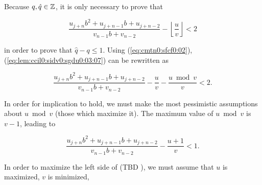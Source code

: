 \begin{vworklemmaproof}
Because $q, \hat{q} \in {\mathbb{Z}}$, it is only necessary to prove that

\begin{equation}
\label{eq:lem:ccil0:sidv0:sgdu0:03:07}
\frac{u_{j+n} b^2 + u_{j+n-1}b + u_{j+n-2}}{v_{n-1}b + v_{n-2}} -
\left\lfloor \frac{u}{v} \right\rfloor
< 2
\end{equation}

in order to prove that $\hat{q}-q \leq 1$.  Using
(\ref{eq:cmtn0:sfcf0:02}), 
(\ref{eq:lem:ccil0:sidv0:sgdu0:03:07}) can be rewritten as

\begin{equation}
\label{eq:lem:ccil0:sidv0:sgdu0:03:08}
\frac{u_{j+n} b^2 + u_{j+n-1}b + u_{j+n-2}}{v_{n-1}b + v_{n-2}} -
\frac{u}{v} -
\frac{u \bmod v}{v}
< 2 .
\end{equation}

In order for implication to hold, we must make the most pessimistic
assumptions about $u \bmod v$ (those which maximize it).  The maximum value
of $u \bmod v$ is $v-1$, leading to

\begin{equation}
\label{eq:lem:ccil0:sidv0:sgdu0:03:09}
\frac{u_{j+n} b^2 + u_{j+n-1}b + u_{j+n-2}}{v_{n-1}b + v_{n-2}} -
\frac{u + 1}{v}
< 1 .
\end{equation}

In order to maximize the left side of (TBD%
),
we must assume that $u$ is maximized, $v$ is minimized, 


\end{vworklemmaproof}
\vworklemmafooter{}

